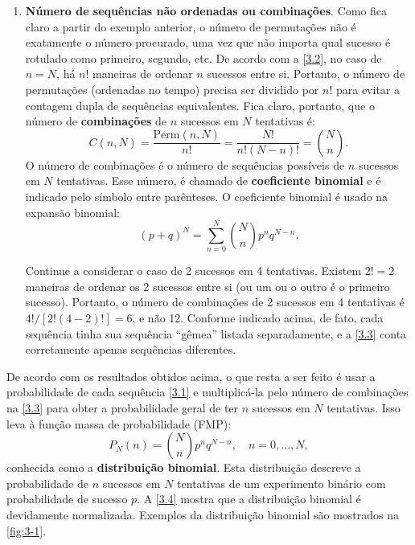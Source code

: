 \begin{enumerate}[noitemsep]
\begin{exemplo}{}{}
\end{exemplo}

\item \textbf{Número de sequências não ordenadas ou combinações}. Como fica claro a partir do exemplo anterior, o número de permutações não é exatamente o número procurado, uma vez que não importa qual sucesso é rotulado como primeiro, segundo, etc. De acordo com a \autoref{3.2}, no caso de $n = N$, há $n!$ maneiras de ordenar $n$ sucessos entre si. Portanto, o número de permutações (ordenadas no tempo) precisa ser dividido por $n!$ para evitar a contagem dupla de sequências equivalentes. Fica claro, portanto, que o número de \textbf{combinações} de $n$ sucessos em $N$ tentativas é:
\begin{equation}\label{3.3}
C(n, N) = \dfrac{\text{Perm}(n, N)}{n!} = \dfrac{N!}{n!(N-n)!} = \binom{N}{n}.
\end{equation}
O número de combinações é o número de sequências possíveis de $n$ sucessos em $N$ tentativas. Esse número, é chamado de \textbf{coeficiente binomial} e é indicado pelo símbolo entre parênteses. O coeficiente binomial é usado na expansão binomial:
\begin{equation}\label{3.4}
(p + q)^N = \sum_{n=0}^{N} \binom{N}{n} p^n q^{N-n}.
\end{equation}

\begin{exemplo}{}{}
Continue a considerar o caso de 2 sucessos em 4 tentativas. Existem $2! = 2$ maneiras de ordenar os 2 sucessos entre si (ou um ou o outro é o primeiro sucesso). Portanto, o número de combinações de 2 sucessos em 4 tentativas é $4!/[2!(4-2)!] = 6$, e não 12. Conforme indicado acima, de fato, cada sequência tinha sua sequência ``gêmea'' listada separadamente, e a \autoref{3.3} conta corretamente apenas sequências diferentes.
\end{exemplo}
\end{enumerate}

De acordo com os resultados obtidos acima, o que resta a ser feito é usar a probabilidade de cada sequência \eqref{3.1} e multiplicá-la pelo número de combinações na \autoref{3.3} para obter a probabilidade geral de ter $n$ sucessos em $N$ tentativas. Isso leva à função massa de probabilidade (FMP):
\begin{equation}\label{3.5}
P_N(n) = \binom{N}{n} p^n q^{N-n}, \quad n = 0, \ldots, N,
\end{equation}
conhecida como a \textbf{distribuição binomial}. Esta distribuição descreve a probabilidade de $n$ sucessos em $N$ tentativas de um experimento binário com probabilidade de sucesso $p$. A \autoref{3.4} mostra que a distribuição binomial é devidamente normalizada. Exemplos da distribuição binomial são mostrados na \autoref{fig:3-1}.

